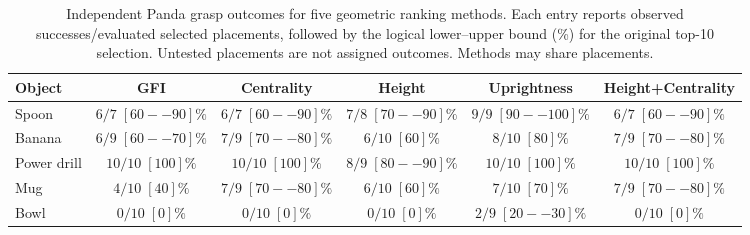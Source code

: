 \begin{table}[t]
\centering
\caption{Independent Panda grasp outcomes for five geometric ranking methods. Each entry reports observed successes/evaluated selected placements, followed by the logical lower--upper bound (\%) for the original top-10 selection. Untested placements are not assigned outcomes. Methods may share placements.}
\label{tab:panda_top10_bounds}
\small
\setlength{\tabcolsep}{4pt}
\begin{tabular}{lccccc}
\hline
Object & GFI & Centrality & Height & Uprightness & Height+Centrality \\
\hline
Spoon & $6/7\;[60--90]\%$ & $6/7\;[60--90]\%$ & $7/8\;[70--90]\%$ & $9/9\;[90--100]\%$ & $6/7\;[60--90]\%$ \\
Banana & $6/9\;[60--70]\%$ & $7/9\;[70--80]\%$ & $6/10\;[60]\%$ & $8/10\;[80]\%$ & $7/9\;[70--80]\%$ \\
Power drill & $10/10\;[100]\%$ & $10/10\;[100]\%$ & $8/9\;[80--90]\%$ & $10/10\;[100]\%$ & $10/10\;[100]\%$ \\
Mug & $4/10\;[40]\%$ & $7/9\;[70--80]\%$ & $6/10\;[60]\%$ & $7/10\;[70]\%$ & $7/9\;[70--80]\%$ \\
Bowl & $0/10\;[0]\%$ & $0/10\;[0]\%$ & $0/10\;[0]\%$ & $2/9\;[20--30]\%$ & $0/10\;[0]\%$ \\
\hline
\end{tabular}
\end{table}
